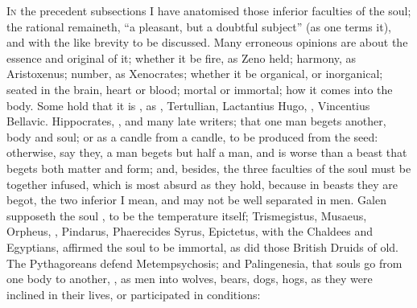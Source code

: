 \lettrine{I}{n} the precedent subsections I have anatomised those inferior
faculties of the soul; the rational remaineth, \enquote{a pleasant, but a doubtful
subject} (as one terms it), and with the like brevity to be
discussed. Many erroneous opinions are about the essence and original of it;
whether it be fire, as Zeno held; harmony, as Aristoxenus; number, as
Xenocrates; whether it be organical, or inorganical; seated in the brain, heart
or blood; mortal or immortal; how it comes into the body. Some hold that it is
, as , Tertullian,
Lactantius  Hugo,
, Vincentius Bellavic.
 Hippocrates,
\Avicenna{}, and many late writers; that one man begets
another, body and soul; or as a candle from a candle, to be produced from the
seed: otherwise, say they, a man begets but half a man, and is worse than a
beast that begets both matter and form; and, besides, the three faculties of
the soul must be together infused, which is most absurd as they hold, because
in beasts they are begot, the two inferior I mean, and may not be well
separated in men. Galen supposeth the soul , to be the temperature itself; Trismegistus, Musaeus, Orpheus, \Homer{},
Pindarus, Phaerecides Syrus, Epictetus, with the Chaldees and Egyptians,
affirmed the soul to be immortal, as did those British
Druids of old. The Pythagoreans defend
Metempsychosis; and Palingenesia, that souls go from one body to another,
, as men into wolves, bears, dogs, hogs, as they
were inclined in their lives, or participated in conditions:


